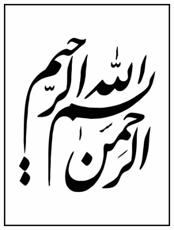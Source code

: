 \documentclass[a4paper, 12pt]{report}
\begin{document}
\let\cleardoublepage\clearpage

\justifying
\thispagestyle{empty}
\mbox{}
\newpage
\thispagestyle{empty}
  \vfill
  \begin{center}
      \includegraphics [width=9cm] {images/page2.jpg}
  \end{center}
  \vfill
\end{document}
